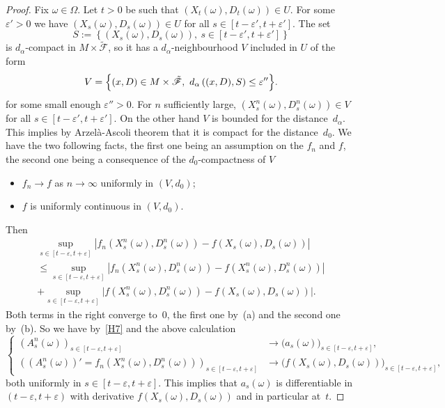 \documentclass[10pt]{amsart}
\theoremstyle{plain}
\theoremstyle{definition}
\newcommand{\SF}{{\mathscr F}}
\let\di\displaystyle
\let\a\alpha
\let\e\varepsilon
\let\Om\Omega
\let\om\omega
\begin{document}
\begin{proof}
Fix $\om\in \Om$. Let $t>0$ be such that $(X_t(\om), D_t(\om))\in U$. For some $\e'>0$ we have $(X_s(\om), D_s(\om))\in U$ for all $s\in [t-\e', t+\e']$. The set
\begin{equation}
S:=\left\{\left(X_s(\om), D_s(\om)\right), \ s\in [t-\e', t+\e'] \right\}
\end{equation}
is $d_\a$-compact in $M\times \tilde \SF$, so it has a $d_\a$-neighbourhood $V$ included in $U$ of the form
\begin{equation}
V=\Bigl\{(x,D)\in M\times \tilde\SF, \ d_\a\left( (x,D),S\right)\le \e'' \Bigr\}.
\end{equation}
for some small enough $ \e''>0$.
For $n$ sufficiently large, $\di \left(X_s^n(\om), D_s^n(\om)\right)\in V$ for all $s\in [t-\e', t+\e']$.
On the other hand $V$ is bounded for the distance~$d_\a$. This implies by Arzelà-Ascoli theorem that it is compact for the distance~$d_0$.
We have the two following facts, the first one being an assumption on the $f_n$ and $f$, the second one being a consequence of the $d_0$-compactness of $V$
\begin{itemize}
\item[(a)] $f_n\to f$ as $n\to\infty$ uniformly in $(V,d_0)$;
\item[(b)] $f$ is uniformly continuous in $(V,d_0)$.
\end{itemize}
Then\vspace*{-8pt}
\begin{multline*}
\sup_{s\in[t-\e,t+\e]}\left|f_n(X_s^n(\om),D_s^n(\om))-f(X_s(\om),D_s(\om))\right|\\[-3pt]
\le \sup_{s\in[t-\e,t+\e]}\left|f_n(X_s^n(\om),D_s^n(\om))-f(X_s^n(\om),D_s^n(\om))\right|\\[-3pt]
+\sup_{s\in[t-\e,t+\e]}\bigl|f(X_s^n(\om),D_s^n(\om))-f(X_s(\om),D_s(\om))\bigr|.
\end{multline*}
Both terms in the right converge to~$0$, the first one by~(a) and the second one by~(b).
So we have by~\eqref{H7} and the above calculation\vspace*{-3pt}
\begin{equation}
\left\{\begin{aligned}
\left(A_s^n(\om)\right)_{s\in[t-\e,t+\e]}&\rightarrow \bigl(a_s(\om)\bigr)_{s\in[t-\e,t+\e]},\\
\left((A_s^n(\om))'\!=\!f_n(X_s^n(\om), D_s^n(\om))\right)_{s\in[t-\e,t+\e]}&\rightarrow \bigl(f(X_s(\om), D_s(\om))\bigr)_{s\in[t-\e,t+\e]},
\end{aligned}\right.
\end{equation}
both uniformly in $s\in[t-\e,t+\e]$. This implies that $a_s(\om)$ is differentiable in $(t-\e, t+\e)$ with derivative $f(X_s(\om), D_s(\om))$ and in particular at~$t$.


\end{proof}
\end{document}
